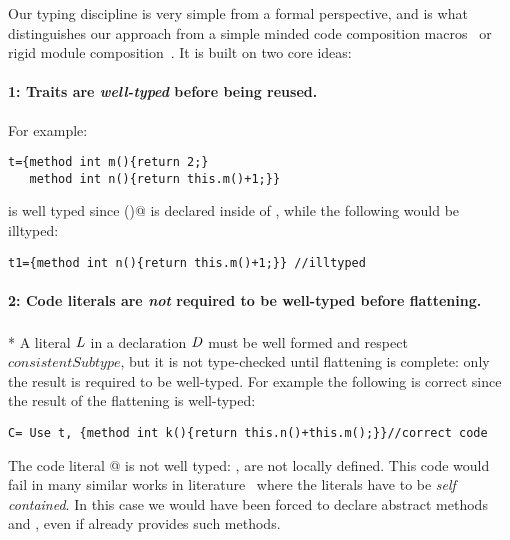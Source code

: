 Our typing discipline is very simple from a formal perspective,  
and is what distinguishes our approach from a simple minded code composition macros~\cite{bawden1999quasiquotation}
or rigid module composition~\cite{ancona2002calculus}. 
It is built on two core ideas:

\paragraph{1: Traits are \emph{well-typed} before being reused.}
 For example:

\saveSpace\saveSpace\begin{lstlisting}
t={method int m(){return 2;} 
   method int n(){return this.m()+1;}}
\end{lstlisting}\saveSpace\saveSpace

\noindent \Q@t@ is well typed since \Q@m()@ is declared inside of \Q@t@, while the following would be illtyped:

\saveSpace\saveSpace\begin{lstlisting}
t1={method int n(){return this.m()+1;}} //illtyped
\end{lstlisting}\saveSpace\saveSpace


\paragraph{2: Code literals are \emph{not} required to be well-typed before flattening.}${}_{}$\\*
A literal $\mathit{L}$ in a declaration $\mathit{D}$
must be well formed and respect
$\mathit{consistentSubtype}$, but
it is not type-checked until flattening is complete:
only the result is required to be well-typed.
For example the following is correct since
the result of the flattening is well-typed:

\saveSpace\saveSpace\begin{lstlisting}
C= Use t, {method int k(){return this.n()+this.m();}}//correct code
\end{lstlisting}\saveSpace\saveSpace

\noindent The code literal
@
is not well typed: \Q@n@, \Q@m@ are not locally defined.
This code would fail in many similar works in literature~\cite{deep,Bettini2015282,Bergel2007} where the
literals have to be \emph{self contained}. In this case we would have been forced to
declare abstract methods \Q@n@ and \Q@m@, even if \Q@t@ already 
provides such methods.

